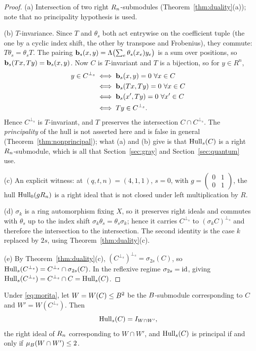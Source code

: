 \begin{proof}
(a) Intersection of two right $R_n$-submodules
(Theorem~\ref{thm:duality}(a)); note that no principality hypothesis is used.

(b) $T$-invariance. Since $T$ and $\theta_s$ both act entrywise on the
coefficient tuple (the one by a cyclic index shift, the other by transpose and
Frobenius), they commute: $T\theta_s=\theta_sT$. The pairing
$\mathbf b_s(x,y)=\Lambda\bigl(\sum_e\theta_s(x_e)y_e\bigr)$ is a sum over
positions, so $\mathbf b_s(Tx,Ty)=\mathbf b_s(x,y)$. Now $C$ is $T$-invariant and $T$ is a
bijection, so for $y\in R^n$,
\[
  \begin{aligned}
    y\in C^{\perp_s}
    &\iff \mathbf b_s(x,y)=0\ \forall x\in C\\
    &\iff \mathbf b_s(Tx,Ty)=0\ \forall x\in C\\
    &\iff \mathbf b_s(x',Ty)=0\ \forall x'\in C\\
    &\iff Ty\in C^{\perp_s}.
  \end{aligned}
\]
Hence $C^{\perp_s}$ is $T$-invariant, and $T$ preserves the intersection
$C\cap C^{\perp_s}$. The \emph{principality} of the hull is not asserted here
and is false in general (Theorem~\ref{thm:nonprincipal}); what (a) and (b)
give is that $\operatorname{Hull}_s(C)$ is a right $R_n$-submodule, which is all that
Section~\ref{sec:gray} and Section~\ref{sec:quantum} use.

(c) An explicit witness: at $(q,t,n)=(4,1,1)$, $s=0$, with
$g=\begin{pmatrix}0&1\\0&1\end{pmatrix}$, the hull $\operatorname{Hull}_0(gR_n)$ is a right
ideal that is not closed under left multiplication by $R$.

(d) $\sigma_k$ is a ring automorphism fixing $X$, so it preserves right ideals
and commutes with $\theta_s$ up to the index shift
$\sigma_k\theta_s=\theta_s\sigma_k$; hence it carries $C^{\perp_s}$ to
$(\sigma_kC)^{\perp_s}$ and therefore the intersection to the intersection. The
second identity is the case $k$ replaced by $2s$, using
Theorem~\ref{thm:duality}(c).

(e) By Theorem~\ref{thm:duality}(c),
$(C^{\perp_s})^{\perp_s}=\sigma_{2s}(C)$, so
$\operatorname{Hull}_s(C^{\perp_s})=C^{\perp_s}\cap\sigma_{2s}(C)$. In the reflexive regime
$\sigma_{2s}=\mathrm{id}$, giving $\operatorname{Hull}_s(C^{\perp_s})=C^{\perp_s}\cap C=\operatorname{Hull}_s(C)$.
\end{proof}

\begin{proposition}
\label{prop:moritahull}
Under \eqref{eq:morita}, let $W=W(C)\le B^2$ be the $B$-submodule
corresponding to $C$ and $W'=W(C^{\perp_s})$. Then
\[
  \operatorname{Hull}_s(C)=I_{W\cap W'},
\]
the right ideal of $R_n$ corresponding to $W\cap W'$, and
$\operatorname{Hull}_s(C)$ is principal if and only if $\mu_{B}(W\cap W')\le2$.
\end{proposition}

